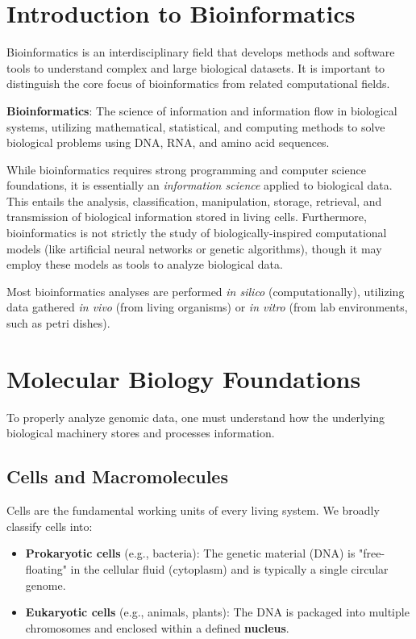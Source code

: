 \documentclass[11pt,a4paper]{article}
\newenvironment{important}{
    \vspace{1em}
    \begin{tcolorbox}[colback=blue!5!white, colframe=blue!75!black, boxrule=1pt, arc=4pt, left=10pt, right=10pt, top=10pt, bottom=10pt]
}{
    \end{tcolorbox}
    \vspace{1em}
}
\begin{document}

\section{Introduction to Bioinformatics}

Bioinformatics is an interdisciplinary field that develops methods and software tools to understand complex and large biological datasets. It is important to distinguish the core focus of bioinformatics from related computational fields. 

\begin{important}
    \textbf{Bioinformatics}: The science of information and information flow in biological systems, utilizing mathematical, statistical, and computing methods to solve biological problems using DNA, RNA, and amino acid sequences.
\end{important}

While bioinformatics requires strong programming and computer science foundations, it is essentially an \textit{information science} applied to biological data. This entails the analysis, classification, manipulation, storage, retrieval, and transmission of biological information stored in living cells. Furthermore, bioinformatics is not strictly the study of biologically-inspired computational models (like artificial neural networks or genetic algorithms), though it may employ these models as tools to analyze biological data.

Most bioinformatics analyses are performed \textit{in silico} (computationally), utilizing data gathered \textit{in vivo} (from living organisms) or \textit{in vitro} (from lab environments, such as petri dishes).

\section{Molecular Biology Foundations}

To properly analyze genomic data, one must understand how the underlying biological machinery stores and processes information. 

\subsection{Cells and Macromolecules}
Cells are the fundamental working units of every living system. We broadly classify cells into:
\begin{itemize}
    \item \textbf{Prokaryotic cells} (e.g., bacteria): The genetic material (DNA) is "free-floating" in the cellular fluid (cytoplasm) and is typically a single circular genome.
    \item \textbf{Eukaryotic cells} (e.g., animals, plants): The DNA is packaged into multiple chromosomes and enclosed within a defined \textbf{nucleus}.
\end{itemize}
\end{document}
